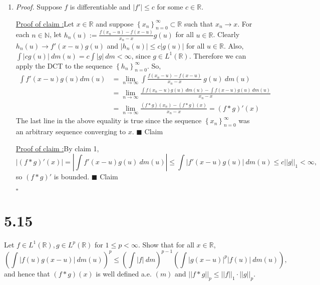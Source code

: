 \documentclass[12pt]{article}
\newcounter{ProofCounter}
\newcounter{ClaimCounter}[ProofCounter]
\newenvironment{Proof}{\stepcounter{ProofCounter}\textit{Proof.}}{\hfill$\square$}
\newenvironment{claim}[1]{\vspace{3mm}\stepcounter{ClaimCounter}\par\noindent\underline{\bf Claim \theClaimCounter:}\space#1}{}
\newenvironment{claimproof}[1]{\par\noindent\underline{Proof of claim \theClaimCounter:}\space#1}{\hfill $\blacksquare$ Claim \theClaimCounter}
\begin{document}
\begin{enumerate}[label=(\alph*)]
\item 
\begin{Proof}
Suppose $f$ is differentiable and $|f'| \leq c$ for some $c \in \mathbb{R}$. 
\begin{claimproof}
Let $x \in \mathbb{R}$ and suppose $\left\{ x_{n}
\right\}_{n=0}^{\infty} \subset \mathbb{R}$ such that $x_{n} \rightarrow x$. For each $n \in \mathbb{N}$, let $h_{n}(u) := \frac{f(x_{n} -u) -
f(x-u)}{x_{n} - x}g(u)$ for all $u \in \mathbb{R}$. Clearly $h_{n}(u) \rightarrow f'(x-u)g(u)$ and $|h_{n}(u)| \leq c|g(u)|$ for all $u \in
\mathbb{R}$. Also, $\int |cg(u)|\ dm(u) = c \int |g|\ dm < \infty$,
since $g \in L^{1}(\mathbb{R})$. Therefore we can apply the DCT to the sequence $\left\{ h_{n} \right\}_{n=0}^{\infty}$. So,
\begin{align*}
\int f'(x-u)g(u)dm(u) & = \lim_{n\rightarrow\infty}\int \frac{f(x_{n} - u) - f(x-u)}{x_{n} - x}\ g(u)\ dm(u) \\
& = \lim_{n\rightarrow\infty} \frac{ \int f(x_{n} - u)g(u)\ dm(u) - \int f(x-u)g(u)\ dm(u)}{x_{n} - x} \\
& = \lim_{n\rightarrow\infty}\frac{ (f*g)(x_{n}) - (f*g)(x) }{x_{n} - x}  = (f*g)'(x)
\end{align*}
The last line in the above equality is true since the sequence $\left\{ x_{n} \right\}_{n=0}^{\infty}$ was an arbitrary sequence converging to $x$.
\end{claimproof}

\begin{claimproof}
By claim 1, 
\[ |(f*g)'(x)| = \left| \int f'(x-u)g(u)\ dm(u)\right| \leq \int |f'(x-u)g(u)|\ dm(u) \leq c ||g||_{1} < \infty, \]
so $(f*g)'$ is bounded.
\end{claimproof}

\end{Proof}

\end{enumerate}














\newpage 
\section*{5.15}
Let $f \in L^{1}(\mathbb{R}), g \in L^{p}(\mathbb{R})$ for $1 \leq p < \infty$. Show that for all $x \in \mathbb{R}$,
\[ \left( \int |f(u)g(x-u)|\ dm(u) \right)^{p} \leq \left( \int |f|\ dm \right)^{p-1}\left( \int |g(x-u)|^{p}|f(u)|\ dm(u) \right), \]
and hence that $(f*g)(x)$ is well defined a.e. $(m)$ and $||f*g||_{p} \leq ||f||_{1}\cdot ||g||_{p}$.
\end{document}
